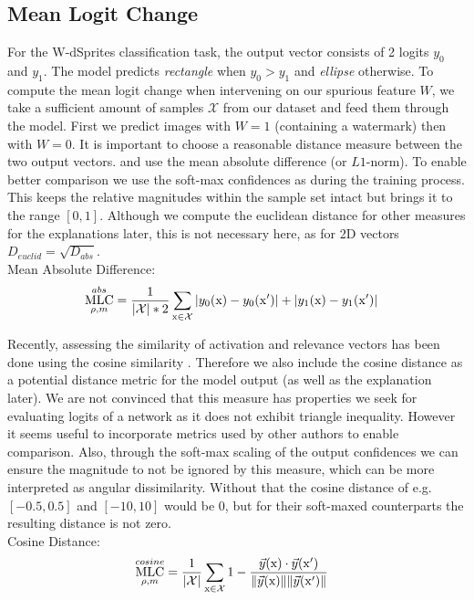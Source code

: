 \subsection{Mean Logit Change}
For the W-dSprites classification task, the output vector consists of 2 logits $y_0$ and $y_1$. The model predicts \textit{rectangle} when $y_0 > y_1$ and \textit{ellipse} otherwise. To compute the mean logit change when intervening on our spurious feature $W$, we take a sufficient amount of samples $\mathcal{X}$ from our dataset and feed them through the model. First we predict images with $W=1$ (containing a watermark) then with $W=0$. It is important to choose a reasonable distance measure between the two output vectors. \cite{Sixt2022a} and \cite{Goyal2019} use the mean absolute difference (or $L1$-norm). To enable better comparison we use the soft-max confidences as during the training process. This keeps the relative magnitudes within the sample set intact but brings it to the range $[0,1]$. Although we compute the euclidean distance for other measures for the explanations later, this is not necessary here, as for 2D vectors $D_{euclid} = \sqrt{D_{abs}}$.\\

Mean Absolute Difference:
\begin{align}\displaystyle 
& \operatorname*{MLC}_{\rho, m}^{abs} = \frac{1}{|\mathcal{X}| * 2} \sum_{\mathrm{x} \in \mathcal{X}} 
|y_0(\mathrm{x}) -y_0(\mathrm{x'})| + |y_1(\mathrm{x}) -y_1(\mathrm{x'})| 
\end{align}

Recently, assessing the similarity of activation and relevance vectors has been done using the cosine similarity \cite{Sixt2020, Dreyer2023a, Achtibat2022}. Therefore we also include the cosine distance as a potential distance metric for the model output (as well as the explanation later). We are not convinced that this measure has properties we seek for evaluating logits of a network as it does not exhibit triangle inequality. However it seems useful to incorporate metrics used by other authors to enable comparison. Also, through the soft-max scaling of the output confidences we can ensure the magnitude to not be ignored by this measure, which can be more interpreted as angular dissimilarity. Without that the cosine distance of e.g. $[-0.5,0.5]$ and $[-10,10]$ would be 0, but for their soft-maxed counterparts the resulting distance is not zero. \\

Cosine Distance:
\begin{align}\displaystyle 
& \operatorname*{MLC}_{\rho, m}^{cosine} = \frac{1}{|\mathcal{X}|}\sum_{\mathrm{x} \in \mathcal{X}}  
1 - \frac{\vec{y}(\mathrm{x}) \cdot \vec{y}(\mathrm{x'})}
{\lVert \vec{y}(\mathrm{x}) \rVert \lVert \vec{y}(\mathrm{x'})\rVert }
\end{align}



